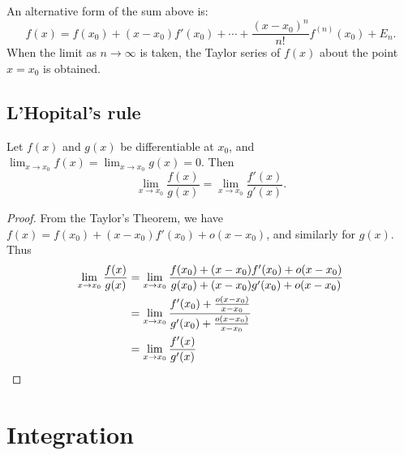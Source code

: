 \documentclass[a4paper]{article}
\begin{document}
An alternative form of the sum above is:
\[
  f(x) = f(x_0) + (x-x_0)f'(x_0) + \cdots + \frac{(x-x_0)^n}{n!}f^{(n)}(x_0) + E_n.
\]
When the limit as $n\to \infty$ is taken, the Taylor series of $f(x)$ about the point $x = x_0$ is obtained.

\subsection{L'Hopital's rule}
\begin{thm}
  Let $f(x)$ and $g(x)$ be differentiable at $x_0$, and $\displaystyle \lim_{x\to x_0}f(x) = \lim_{x\to x_0}g(x) = 0$. Then
  \[
    \lim_{x\to x_0} \frac{f(x)}{g(x)} = \lim_{x\to x_0} \frac{f'(x)}{g'(x)}.
  \]
\end{thm}
\begin{proof}
  From the Taylor's Theorem, we have $f(x) = f(x_0) + (x - x_0)f'(x_0) + o(x - x_0)$, and similarly for $g(x)$. Thus
  \begin{align*}
    \lim_{x\to x_0} \frac{f(x)}{g(x)} &= \lim_{x\to x_0} \frac{f(x_0) + (x - x_0)f'(x_0) + o(x - x_0)}{g(x_0) + (x - x_0)g'(x_0) + o(x - x_0)}\\
    &= \lim_{x\to x_0} \frac{f'(x_0) + \frac{o(x-x_0)}{x-x_0}}{g'(x_0) + \frac{o(x-x_0)}{x-x_0}}\\
    &= \lim_{x\to x_0} \frac{f'(x)}{g'(x)}\qedhere
  \end{align*}
\end{proof}

\section{Integration}
\end{document}

